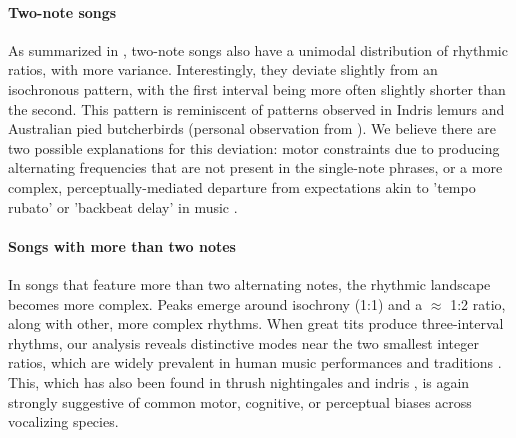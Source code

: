\paragraph{Two-note songs}
As summarized in , two-note songs also have a unimodal distribution of rhythmic ratios, with more variance. Interestingly, they deviate slightly from an isochronous pattern, with the first interval being more often slightly shorter than the second. This pattern is reminiscent of patterns observed in Indris lemurs \autocite{degregorio2021} and Australian pied butcherbirds (personal observation from \cite{xing2022}). We believe there are two possible explanations for this deviation: motor constraints due to producing alternating frequencies that are not present in the single-note phrases, or a more complex, perceptually-mediated departure from expectations akin to 'tempo rubato' \autocite{parncutt1994, degregorio2021} or 'backbeat delay' in music \autocite{frane2017}.

\paragraph{Songs with more than two notes}
In songs that feature more than two alternating notes, the rhythmic landscape becomes more complex. Peaks emerge around isochrony (1:1) and a $\approx$ 1:2 ratio, along with other, more complex rhythms. When great tits produce three-interval rhythms, our analysis reveals distinctive modes near the two smallest integer ratios, which are widely prevalent in human music performances and traditions \autocite{jacoby2017a, jacoby2021}. This, which has also been found in thrush nightingales and indris \autocite{roeske2020, degregorio2021}, is again strongly suggestive of common motor, cognitive, or perceptual biases across vocalizing species.

